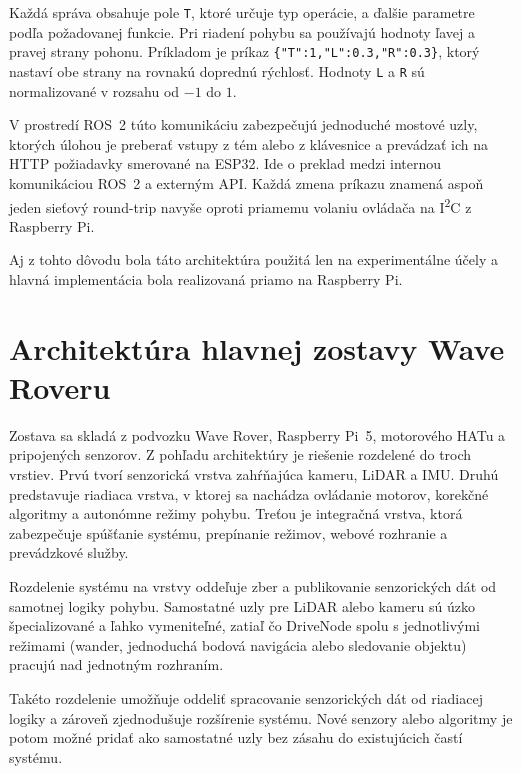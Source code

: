        Každá správa obsahuje pole \texttt{T}, ktoré určuje typ operácie, a ďalšie parametre podľa požadovanej funkcie. Pri riadení pohybu sa používajú hodnoty ľavej a pravej strany pohonu. Príkladom je príkaz \texttt{\{"T":1,"L":0.3,"R":0.3\}}, ktorý nastaví obe strany na rovnakú doprednú rýchlosť. Hodnoty \texttt{L} a \texttt{R} sú normalizované v rozsahu od $-1$ do $1$.
      
        V prostredí ROS~2 túto komunikáciu zabezpečujú jednoduché mostové uzly, ktorých úlohou je preberať vstupy z tém alebo z klávesnice a prevádzať ich na HTTP požiadavky smerované na ESP32. Ide o preklad medzi internou komunikáciou ROS~2 a externým API. Každá zmena príkazu znamená aspoň jeden sieťový round-trip navyše oproti priamemu volaniu ovládača na I\textsuperscript{2}C z Raspberry Pi.
      
        Aj z tohto dôvodu bola táto architektúra použitá len na experimentálne účely 
        a hlavná implementácia bola realizovaná priamo na Raspberry Pi.
      
        \section{Architektúra hlavnej zostavy Wave Roveru}
        \label{sec:architektura-auticko}
      
        Zostava sa skladá z podvozku Wave Rover, Raspberry Pi~5, motorového HATu a pripojených senzorov. Z pohľadu architektúry je riešenie rozdelené do troch vrstiev. Prvú tvorí senzorická vrstva zahŕňajúca kameru, LiDAR a IMU. Druhú predstavuje riadiaca vrstva, v ktorej sa nachádza ovládanie motorov, korekčné algoritmy a autonómne režimy pohybu. Treťou je integračná vrstva, ktorá zabezpečuje spúšťanie systému, prepínanie režimov, webové rozhranie a prevádzkové služby.
      
        Rozdelenie systému na vrstvy oddeľuje zber a publikovanie senzorických dát od samotnej logiky pohybu. Samostatné uzly pre LiDAR alebo kameru sú úzko špecializované a ľahko vymeniteľné, zatiaľ čo DriveNode spolu s jednotlivými režimami (wander, jednoduchá bodová navigácia alebo sledovanie objektu) pracujú nad jednotným rozhraním.
      
        Takéto rozdelenie umožňuje oddeliť spracovanie senzorických dát 
        od riadiacej logiky a zároveň zjednodušuje rozšírenie systému. 
        Nové senzory alebo algoritmy je potom možné pridať ako samostatné uzly 
        bez zásahu do existujúcich častí systému.
      
